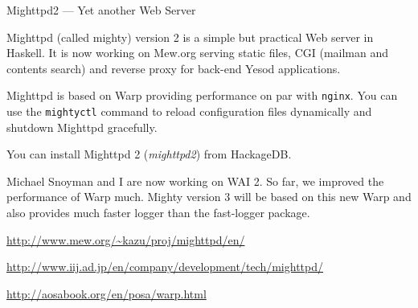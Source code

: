 \begin{hcarentry}[updated]{Mighttpd2 --- Yet another Web Server}
\label{mighttpd2}
\makeheader

Mighttpd (called mighty) version 2 is a simple but practical Web server in Haskell.
It is now working on Mew.org serving static files, CGI (mailman and contents search) and reverse proxy for back-end Yesod applications.

Mighttpd is based on Warp providing
performance on par with {\tt nginx}.
You can use the {\tt mightyctl} command to
reload configuration files dynamically and shutdown Mighttpd gracefully.

You can install Mighttpd 2 ({\it mighttpd2}) from HackageDB.

Michael Snoyman and I are now working on WAI 2. So far, we improved the performance of Warp much. Mighty version 3 will be based on this new Warp and also provides much faster logger than the fast-logger package.

\FurtherReading
\begin{compactitem}
\item \url{http://www.mew.org/~kazu/proj/mighttpd/en/}
\item \url{http://www.iij.ad.jp/en/company/development/tech/mighttpd/}
\item \url{http://aosabook.org/en/posa/warp.html}
\end{compactitem}
\end{hcarentry}
